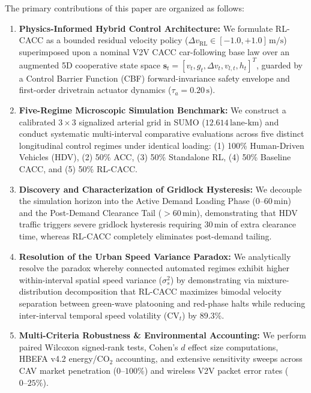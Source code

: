 \documentclass[11pt,a4paper]{article}
\begin{document}
The primary contributions of this paper are organized as follows:
\begin{enumerate}
    \item \textbf{Physics-Informed Hybrid Control Architecture:} We formulate RL-CACC as a bounded residual velocity policy ($\Delta v_{\text{RL}} \in [-1.0, +1.0]\,\mathrm{m/s}$) superimposed upon a nominal V2V CACC car-following base law over an augmented 5D cooperative state space $\mathbf{s}_t = [v_t, g_t, \Delta v_t, v_{l,t}, h_t]^T$, guarded by a Control Barrier Function (CBF) forward-invariance safety envelope and first-order drivetrain actuator dynamics ($\tau_a = 0.20\,\mathrm{s}$).
    
    \item \textbf{Five-Regime Microscopic Simulation Benchmark:} We construct a calibrated $3\times3$ signalized arterial grid in SUMO ($12.614\,\text{lane-km}$) and conduct systematic multi-interval comparative evaluations across five distinct longitudinal control regimes under identical loading: (1) 100\% Human-Driven Vehicles (HDV), (2) 50\% ACC, (3) 50\% Standalone RL, (4) 50\% Baseline CACC, and (5) 50\% RL-CACC.
    
    \item \textbf{Discovery and Characterization of Gridlock Hysteresis:} We decouple the simulation horizon into the Active Demand Loading Phase ($0\text{--}60\,\text{min}$) and the Post-Demand Clearance Tail ($>60\,\text{min}$), demonstrating that HDV traffic triggers severe gridlock hysteresis requiring $30\,\text{min}$ of extra clearance time, whereas RL-CACC completely eliminates post-demand tailing.
    
    \item \textbf{Resolution of the Urban Speed Variance Paradox:} We analytically resolve the paradox whereby connected automated regimes exhibit higher within-interval spatial speed variance ($\sigma_s^2$) by demonstrating via mixture-distribution decomposition that RL-CACC maximizes bimodal velocity separation between green-wave platooning and red-phase halts while reducing inter-interval temporal speed volatility ($\text{CV}_t$) by 89.3\%.
    
    \item \textbf{Multi-Criteria Robustness \& Environmental Accounting:} We perform paired Wilcoxon signed-rank tests, Cohen's $d$ effect size computations, HBEFA v4.2 energy/$\text{CO}_2$ accounting, and extensive sensitivity sweeps across CAV market penetration ($0\text{--}100\%$) and wireless V2V packet error rates ($0\text{--}25\%$).
\end{enumerate}
\end{document}

